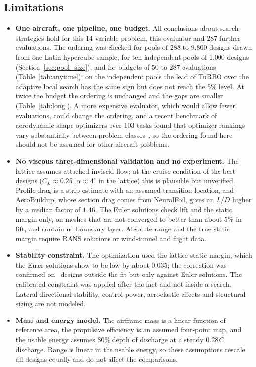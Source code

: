 \subsection{Limitations}
\label{sec:limitations}
\begin{itemize}
    \item \textbf{One aircraft, one pipeline, one budget.} All conclusions about search strategies hold for this 14-variable problem, this evaluator and 287 further evaluations. The ordering was checked for pools of 288 to 9{,}800 designs drawn from one Latin hypercube sample, for ten independent pools of 1{,}000 designs (Section~\ref{sec:pool_size}), and for budgets of 50 to 287 evaluations (Table~\ref{tab:anytime}); on the independent pools the lead of TuRBO over the adaptive local search has the same sign but does not reach the 5\% level. At twice the budget the ordering is unchanged and the gaps are smaller (Table~\ref{tab:long}). A more expensive evaluator, which would allow fewer evaluations, could change the ordering, and a recent benchmark of aerodynamic shape optimizers over 103 tasks found that optimizer rankings vary substantially between problem classes~\cite{fazliani2026shapebench}, so the ordering found here should not be assumed for other aircraft problems.
    \item \textbf{No viscous three-dimensional validation and no experiment.} The lattice assumes attached inviscid flow; at the cruise condition of the best designs ($C_L \approx 0.25$, $\alpha \approx 4^\circ$ in the lattice) this is plausible but unverified. Profile drag is a strip estimate with an assumed transition location, and AeroBuildup, whose section drag comes from NeuralFoil, gives an $L/D$ higher by a median factor of $1.46$. The Euler solutions check lift and the static margin only, on meshes that are not converged to better than about $5\%$ in lift, and contain no boundary layer. Absolute range and the true static margin require RANS solutions or wind-tunnel and flight data.
    \item \textbf{Stability constraint.} The optimization used the lattice static margin, which the Euler solutions show to be low by about $0.035$; the correction was confirmed on \NoosN\ designs outside the fit but only against Euler solutions. The calibrated constraint was applied after the fact and not inside a search. Lateral-directional stability, control power, aeroelastic effects and structural sizing are not modeled.
    \item \textbf{Mass and energy model.} The airframe mass is a linear function of reference area, the propulsive efficiency is an assumed four-point map, and the usable energy assumes $80\%$ depth of discharge at a steady $0.28\,C$ discharge. Range is linear in the usable energy, so these assumptions rescale all designs equally and do not affect the comparisons.

\end{itemize}
